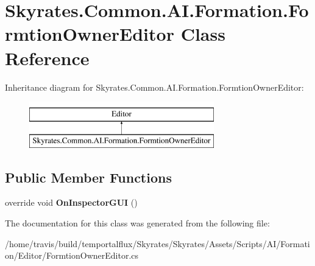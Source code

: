 \hypertarget{class_skyrates_1_1_common_1_1_a_i_1_1_formation_1_1_formtion_owner_editor}{\section{Skyrates.\-Common.\-A\-I.\-Formation.\-Formtion\-Owner\-Editor Class Reference}
\label{class_skyrates_1_1_common_1_1_a_i_1_1_formation_1_1_formtion_owner_editor}
}
Inheritance diagram for Skyrates.\-Common.\-A\-I.\-Formation.\-Formtion\-Owner\-Editor\-:\begin{figure}[H]
\begin{center}
\leavevmode
\includegraphics[height=2.000000cm]{class_skyrates_1_1_common_1_1_a_i_1_1_formation_1_1_formtion_owner_editor}
\end{center}
\end{figure}
\subsection*{Public Member Functions}
\begin{DoxyCompactItemize}
\item 
\hypertarget{class_skyrates_1_1_common_1_1_a_i_1_1_formation_1_1_formtion_owner_editor_ad7314df7c5a8b05e4db50e289e90ed54}{override void {\bfseries On\-Inspector\-G\-U\-I} ()}\label{class_skyrates_1_1_common_1_1_a_i_1_1_formation_1_1_formtion_owner_editor_ad7314df7c5a8b05e4db50e289e90ed54}

\end{DoxyCompactItemize}


The documentation for this class was generated from the following file\-:\begin{DoxyCompactItemize}
\item 
/home/travis/build/temportalflux/\-Skyrates/\-Skyrates/\-Assets/\-Scripts/\-A\-I/\-Formation/\-Editor/Formtion\-Owner\-Editor.\-cs\end{DoxyCompactItemize}
